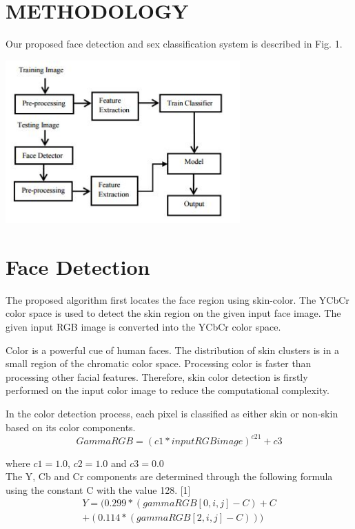 \documentclass[journal]{IEEEtran}
\begin{document}
	\section{\textbf{METHODOLOGY}}
	Our proposed face detection and sex classification system is
	described in Fig. 1.\\
	\begin{minipage}{\linewidth}
		\centering
		\includegraphics[width = 90mm]{Methodology.JPG}
	\end{minipage} 
	
	\section{\textbf{Face Detection}}
	   The proposed algorithm first locates the face region
	using skin-color. The YCbCr color space is used to detect
	the skin region on the given input face image. The given
	input RGB image is converted into the YCbCr color
	space.
	
	
	  Color is a powerful cue of human faces. The
	distribution of skin clusters is in a small region of the
	chromatic color space. Processing color is faster than
	processing other facial features. Therefore, skin color
	detection is firstly performed on the input color image to
	reduce the computational complexity.
	
	In the color detection process, each pixel is classified as
	either skin or non-skin based on its color components.
	 \begin{equation}
	  GammaRGB=(c1*inputRGBimage)^{c21} + c3
	 \end{equation}
	
	where $c1=1.0$, $c2=1.0$ and $c3=0.0$\vspace{1mm}\\
	 
	 The Y, Cb and Cr components are determined through
	the following formula using the constant C with the value
	128. [1]
	\begin{equation}
	\begin{split}
	Y=(0.299*(gammaRGB[0,i,j]-C)+C\\
	+(0.114*(gammaRGB[2,i,j]-C)))
	\end{split}
	\end{equation}
	
\end{document}
